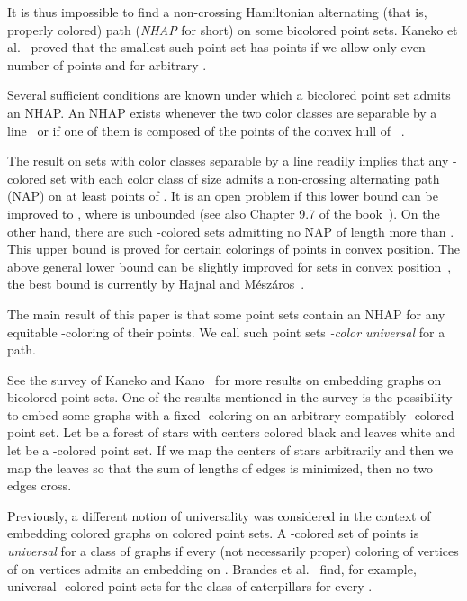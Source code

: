 \documentclass[12pt]{article}
\begin{document}
It is thus impossible to find a non-crossing Hamiltonian alternating (that is, properly colored) path (\emph{NHAP} for short) 
on some bicolored point sets. Kaneko et al.~\cite{kanekokanosuzuki} proved that the smallest such point set 
has  points if we allow only even number  of points and  for arbitrary . 

Several sufficient conditions are known under which a bicolored point set admits an NHAP. An NHAP exists whenever
the two color classes are separable by a line~\cite{abellanas99} or if one of them is composed of 
the points of the convex hull of ~\cite{abellanas99}.

The result on sets with color classes separable by a line readily implies that any -colored 
set  with each color class of size  admits a non-crossing alternating path (NAP) on at least  
points of . It is an open problem if this lower bound can be improved to , where 
is unbounded (see also Chapter 9.7 of the book~\cite{brassmoserpach}). 
On the other hand, there are such -colored sets admitting no NAP of length more than 
\cite{abellanas03,kynclpt}.
This upper bound is proved for certain colorings of points in convex position. The above
general lower bound  can be slightly improved for sets in convex position~\cite{kynclpt, hajnalmeszaros}, 
the best bound is currently  by Hajnal and M\'esz\'aros~\cite{hajnalmeszaros}.


The main result of this paper is that some point sets contain an NHAP for any equitable 
-coloring of their points. We call such point sets \emph{-color universal} for a path.

See the survey of Kaneko and Kano~\cite{kanekokano} for more results on embedding graphs on bicolored point sets.
One of the results mentioned in the survey is the possibility to embed some graphs with a fixed -coloring on
an arbitrary compatibly -colored point set. Let  be a forest of stars with centers colored black and 
leaves white and let  be a -colored point set. If we map the centers of stars arbitrarily and then 
we map the leaves so that the sum of lengths of edges is minimized, then no two edges cross.

Previously, a different notion of universality was considered in the context of embedding colored graphs 
on colored point sets. A -colored set  of  points is \emph{universal} for a class  
of graphs if every (not necessarily proper) coloring of vertices of  on  vertices 
admits an embedding on . Brandes et al.~\cite{brandes10+} find, for example, universal -colored 
point sets for the class of caterpillars for every .
\end{document}
